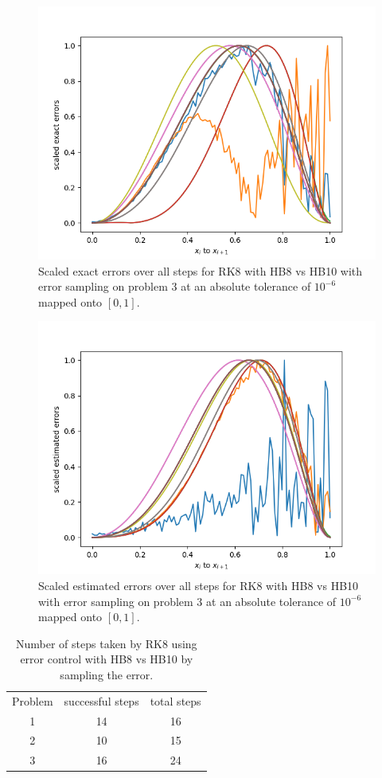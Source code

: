 \begin{figure}[H]
\centering
\includegraphics[width=0.7\linewidth]{./figures/rk8_with_hb8_hb10_sampling_p3_scaled_errors}
\caption{Scaled exact errors over all steps for RK8 with HB8 vs HB10 with error sampling on problem 3 at an absolute tolerance of $10^{-6}$ mapped onto $[0, 1]$.}
\label{fig:rk8_with_hb8_hb10_sampling_p3_scaled_errors}
\end{figure}

\begin{figure}[H]
\centering
\includegraphics[width=0.7\linewidth]{./figures/rk8_with_hb8_hb10_sampling_p3_scaled_estimated_errors}
\caption{Scaled estimated errors over all steps for RK8 with HB8 vs HB10 with error sampling on problem 3 at an absolute tolerance of $10^{-6}$ mapped onto $[0, 1]$.}
\label{fig:rk8_with_hb8_hb10_sampling_p3_scaled_estimated_errors}
\end{figure}

\begin{table}[h]
\caption {Number of steps taken by RK8 using error control with HB8 vs HB10 by sampling the error.} \label{tab:rk8_with_hb8_hb10_sampling_nsteps}
\begin{center}
\begin{tabular}{ c c c } 
Problem & successful steps & total steps \\ 
1       & 14               & 16 \\ 
2       & 10               & 15 \\
3       & 16               & 24 \\
\end{tabular}
\end{center}
\end{table}

